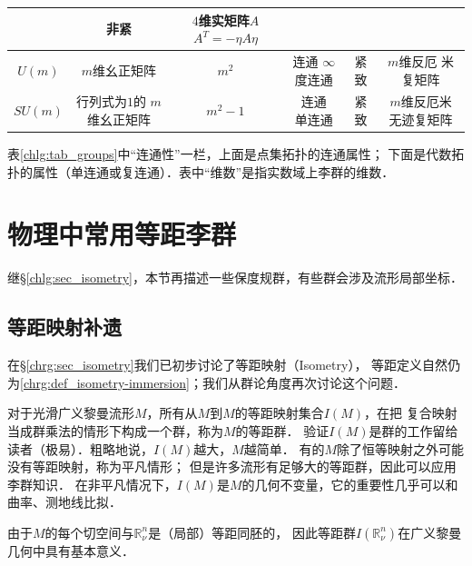 \begin{table}[htb]
\begin{tabular}{|*6{c|}}
        & 非紧 & \makecell{$4$维实矩阵$A$\\$A^T=- \eta A \eta $} \\ \hline
        $U(m)$ & $m$维幺正矩阵 & $m^2$ & \makecell{连通 \\$\infty$度连通 }
        & 紧致 &  \makecell{$m$维反厄\\ 米复矩阵} \\ \hline
        $SU(m)$ & \makecell{行列式为$1$的\\$m$维幺正矩阵} & $m^2-1$ & \makecell{连通\\单连通 }
        & 紧致 & \makecell{$m$维反厄米\\无迹复矩阵} \\ \hline
    \end{tabular}
\end{table}

{\kaishu 表\ref{chlg:tab_groups}中“连通性”一栏，上面是点集拓扑的连通属性；
下面是代数拓扑的属性（单连通或复连通）．表中“维数”是指实数域上李群的维数．}










\section{物理中常用等距李群}\label{chlg:sec_matrixG-II}
继\S\ref{chlg:sec_isometry}，本节再描述一些保度规群\cite{tung-1985}，有些群会涉及流形局部坐标．


\subsection{等距映射补遗}\label{chlg:sec_iso-add}
在\S \ref{chrg:sec_isometry}我们已初步讨论了等距映射（Isometry），
等距定义自然仍为\ref{chrg:def_isometry-immersion}；我们从群论角度再次讨论这个问题．


对于光滑广义黎曼流形$M$，所有从$M$到$M$的等距映射集合$I(M)$，在把
复合映射当成群乘法的情形下构成一个群，称为$M$的{\heiti 等距群}．
验证$I(M)$是群的工作留给读者（极易）．粗略地说，$I(M)$越大，$M$越简单．
有的$M$除了恒等映射之外可能没有等距映射，称为平凡情形；
但是许多流形有足够大的等距群，因此可以应用李群知识．
在非平凡情况下，$I(M)$是$M$的几何不变量，它的重要性几乎可以和曲率、测地线比拟．

由于$M$的每个切空间与$\mathbb{R}^n_\nu$是（局部）等距同胚的，
因此等距群$I(\mathbb{R}^n_\nu)$在广义黎曼几何中具有基本意义．

